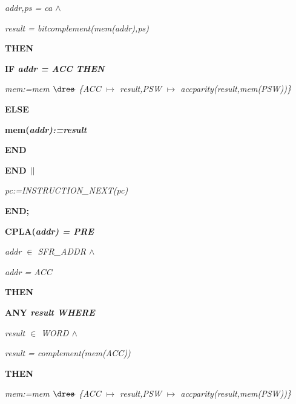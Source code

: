 \begin{sloppypar}
\hspace*{0.30in}\it addr\rm ,\it ps \rm = \it ca  $\land$ 

\hspace*{0.30in}\it result \rm = \it bitcomplement\rm (\it mem\rm (\it addr\rm )\rm ,\it ps\rm )

\hspace*{0.20in}\bf THEN

\hspace*{0.30in}\bf IF \it addr \rm = \it ACC \bf THEN

\hspace*{0.40in}\it mem\rm :=\it mem $\lover$ \rm \{\it ACC $\mapsto$ \it result\rm ,\it PSW $\mapsto$ \it accparity\rm (\it result\rm ,\it mem\rm (\it PSW\rm )\rm )\rm \}

\hspace*{0.30in}\bf ELSE

\hspace*{0.40in}\bf mem\rm (\it addr\rm )\rm :=\it result

\hspace*{0.30in}\bf END

\hspace*{0.20in}\bf END  $\mbox{$\mid\mid$}$ 

\hspace*{0.20in}\it pc\rm :=\it INSTRUCTION\_NEXT\rm (\it pc\rm )

\hspace*{0.10in}\bf END\rm ;

\hspace*{0.10in}\bf CPLA\rm (\it addr\rm ) \rm = \bf PRE

\hspace*{0.20in}\it addr $\in$  \it SFR\_ADDR  $\land$ 

\hspace*{0.20in}\it addr \rm = \it ACC

\hspace*{0.10in}\bf THEN

\hspace*{0.20in}\bf ANY \it result \bf WHERE

\hspace*{0.30in}\it result $\in$  \it WORD  $\land$ 

\hspace*{0.30in}\it result \rm = \it complement\rm (\it mem\rm (\it ACC\rm )\rm )

\hspace*{0.20in}\bf THEN

\hspace*{0.30in}\it mem\rm :=\it mem $\lover$ \rm \{\it ACC $\mapsto$ \it result\rm ,\it PSW $\mapsto$ \it accparity\rm (\it result\rm ,\it mem\rm (\it PSW\rm )\rm )\rm \}


\end{sloppypar}
